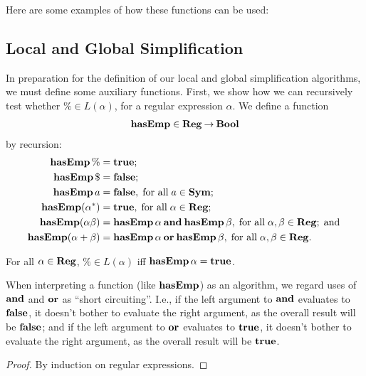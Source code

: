Here are some examples of how these functions can be used:


\subsection{Local and Global Simplification}

In preparation for the definition of our local and global simplification
algorithms, we must define some auxiliary functions.
First, we show how we can recursively test whether $\%\in L(\alpha)$, for
a regular expression $\alpha$.  We define a function
%
%
%
\begin{gather*}
\mathbf{hasEmp}\in\mathbf{Reg}\mathbin{\to}\mathbf{Bool}
\end{gather*}
 by recursion:
\begin{align*}
\mathbf{hasEmp}\,\% &= \mathbf{true} ; \\
\mathbf{hasEmp}\,\$ &= \mathbf{false} ; \\
\mathbf{hasEmp}\,a &= \mathbf{false}, \;\allowbreak\mbox{for all}\allowbreak\;a\in\mathbf{Sym} ; \\
\mathbf{hasEmp}(\alpha^*) &= \mathbf{true} , \;\allowbreak\mbox{for all}\allowbreak\; \alpha\in\mathbf{Reg} ; \\
\mathbf{hasEmp}(\alpha\beta) &=
\mathbf{hasEmp}\,\alpha\mathbin{\mathbf{and}}\mathbf{hasEmp}\,\beta , \;\allowbreak\mbox{for all}\allowbreak\; \alpha,\beta\in\mathbf{Reg} ;
  \;\allowbreak\mbox{and}\allowbreak\; \\
\mathbf{hasEmp}(\alpha+\beta) &=
\mathbf{hasEmp}\,\alpha\mathbin{\mathbf{or}}\mathbf{hasEmp}\,\beta , \;\allowbreak\mbox{for all}\allowbreak\; \alpha,\beta\in\mathbf{Reg} .
\end{align*}

\begin{proposition}
\label{HasEmpProp}
For all $\alpha\in\mathbf{Reg}$, $\%\in L(\alpha)$ iff $\mathbf{hasEmp}\,\alpha =
\mathbf{true}$.
\end{proposition}

When interpreting a function (like $\mathbf{hasEmp}$) as an algorithm, we
regard uses of $\mathbin{\mathbf{and}}$ and $\mathbin{\mathbf{or}}$ as ``short circuiting''. I.e., if
%
%
%
the left argument to $\mathbin{\mathbf{and}}$ evaluates to $\mathbf{false}$, it doesn't bother
to evaluate the right argument, as the overall result will be
$\mathbf{false}$; and if the left argument to $\mathbin{\mathbf{or}}$ evaluates to $\mathbf{true}$, it
doesn't bother to evaluate the right argument, as the overall result
will be $\mathbf{true}$.

\begin{proof}
By induction on regular expressions.
\end{proof}

